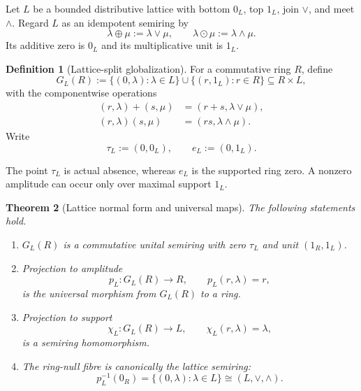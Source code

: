 \documentclass[11pt]{amsart}
\numberwithin{equation}{section}
\newtheorem{theorem}{Theorem}[section]
\theoremstyle{definition}
\newtheorem{definition}[theorem]{Definition}
\begin{document}
Let $L$ be a bounded distributive lattice with bottom $0_L$, top $1_L$,
join $\vee$, and meet $\wedge$.  Regard $L$ as an idempotent semiring by
\[
\lambda\oplus\mu:=\lambda\vee\mu,
\qquad
\lambda\odot\mu:=\lambda\wedge\mu.
\]
Its additive zero is $0_L$ and its multiplicative unit is $1_L$.

\begin{definition}[Lattice-split globalization]
\label{def:lattice-split}
For a commutative ring $R$, define
\[
G_L(R):=
\{(0,\lambda):\lambda\in L\}
\cup
\{(r,1_L):r\in R\}
\subseteq R\times L,
\]
with the componentwise operations
\begin{align*}
(r,\lambda)+(s,\mu)&=(r+s,\lambda\vee\mu),\\
(r,\lambda)(s,\mu)&=(rs,\lambda\wedge\mu).
\end{align*}
Write
\[
\tau_L:=(0,0_L),
\qquad
e_L:=(0,1_L).
\]
\end{definition}

The point $\tau_L$ is actual absence, whereas $e_L$ is the supported ring
zero.  A nonzero amplitude can occur only over maximal support $1_L$.

\begin{theorem}[Lattice normal form and universal maps]
\label{thm:lattice-normal-form}
The following statements hold.
\begin{enumerate}[label=\textup{(\arabic*)}]
\item $G_L(R)$ is a commutative unital semiring with zero $\tau_L$ and
unit $(1_R,1_L)$.
\item Projection to amplitude
\[
p_L:G_L(R)\longrightarrow R,
\qquad
p_L(r,\lambda)=r,
\]
is the universal morphism from $G_L(R)$ to a ring.
\item Projection to support
\[
\chi_L:G_L(R)\longrightarrow L,
\qquad
\chi_L(r,\lambda)=\lambda,
\]
is a semiring homomorphism.
\item The ring-null fibre is canonically the lattice semiring:
\[
p_L^{-1}(0_R)
=\{(0,\lambda):\lambda\in L\}
\cong (L,\vee,\wedge).
\]
\end{enumerate}
\end{theorem}
\end{document}

